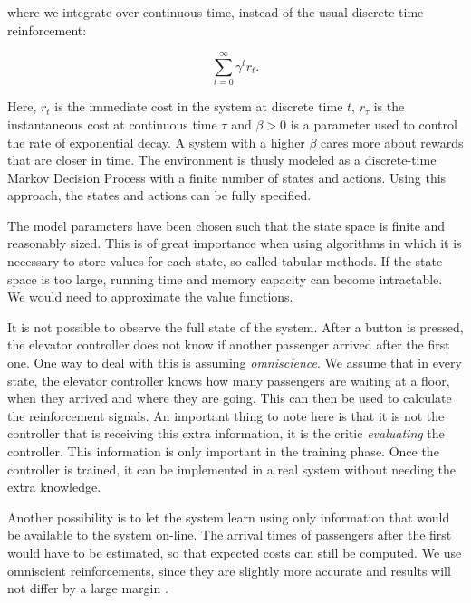 where we integrate over continuous time, instead of the usual discrete-time reinforcement:

\begin{equation*}
    \sum_{t=0}^{\infty} \gamma^t r_t.
\end{equation*}

Here, $r_t$ is the immediate cost in the system at discrete time $t$, $r_\tau$ is the instantaneous cost at continuous time $\tau$ and $\beta > 0$ is a parameter used to control the rate of exponential decay. A system with a higher $\beta$ cares more about rewards that are closer in time. The environment is thusly modeled as a discrete-time Markov Decision Process with a finite number of states and actions. Using this approach, the states and actions can be fully specified.

The model parameters have been chosen such that the state space is finite and reasonably sized. This is of great importance when using algorithms in which it is necessary to store values for each state, so called tabular methods. If the state space is too large, running time and memory capacity can become intractable. We would need to approximate the value functions. 


It is not possible to observe the full state of the system. After a button is pressed, the elevator controller does not know if another passenger arrived after the first one. One way to deal with this is assuming \textit{omniscience}. We assume that in every state, the elevator controller knows how many passengers are waiting at a floor, when they arrived and where they are going. This can then be used to calculate the reinforcement signals. An important thing to note here is that it is not the controller that is receiving this extra information, it is the critic \textit{evaluating} the controller. This information is only important in the training phase. Once the controller is trained, it can be implemented in a real system without needing the extra knowledge.

Another possibility is to let the system learn using only information that would be available to the system on-line. The arrival times of passengers after the first would have to be estimated, so that expected costs can still be computed. We use omniscient reinforcements, since they are slightly more accurate and results will not differ by a large margin \cite{crites_barto_group_1998}. 

